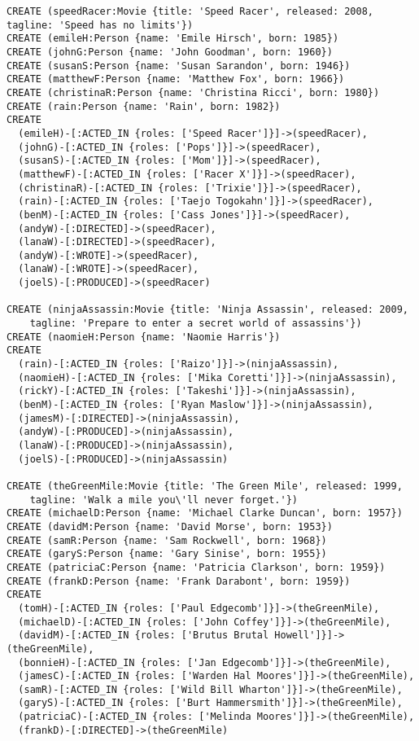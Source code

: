 \begin{lstlisting}
CREATE (speedRacer:Movie {title: 'Speed Racer', released: 2008, tagline: 'Speed has no limits'})
CREATE (emileH:Person {name: 'Emile Hirsch', born: 1985})
CREATE (johnG:Person {name: 'John Goodman', born: 1960})
CREATE (susanS:Person {name: 'Susan Sarandon', born: 1946})
CREATE (matthewF:Person {name: 'Matthew Fox', born: 1966})
CREATE (christinaR:Person {name: 'Christina Ricci', born: 1980})
CREATE (rain:Person {name: 'Rain', born: 1982})
CREATE
  (emileH)-[:ACTED_IN {roles: ['Speed Racer']}]->(speedRacer),
  (johnG)-[:ACTED_IN {roles: ['Pops']}]->(speedRacer),
  (susanS)-[:ACTED_IN {roles: ['Mom']}]->(speedRacer),
  (matthewF)-[:ACTED_IN {roles: ['Racer X']}]->(speedRacer),
  (christinaR)-[:ACTED_IN {roles: ['Trixie']}]->(speedRacer),
  (rain)-[:ACTED_IN {roles: ['Taejo Togokahn']}]->(speedRacer),
  (benM)-[:ACTED_IN {roles: ['Cass Jones']}]->(speedRacer),
  (andyW)-[:DIRECTED]->(speedRacer),
  (lanaW)-[:DIRECTED]->(speedRacer),
  (andyW)-[:WROTE]->(speedRacer),
  (lanaW)-[:WROTE]->(speedRacer),
  (joelS)-[:PRODUCED]->(speedRacer)

CREATE (ninjaAssassin:Movie {title: 'Ninja Assassin', released: 2009,
    tagline: 'Prepare to enter a secret world of assassins'})
CREATE (naomieH:Person {name: 'Naomie Harris'})
CREATE
  (rain)-[:ACTED_IN {roles: ['Raizo']}]->(ninjaAssassin),
  (naomieH)-[:ACTED_IN {roles: ['Mika Coretti']}]->(ninjaAssassin),
  (rickY)-[:ACTED_IN {roles: ['Takeshi']}]->(ninjaAssassin),
  (benM)-[:ACTED_IN {roles: ['Ryan Maslow']}]->(ninjaAssassin),
  (jamesM)-[:DIRECTED]->(ninjaAssassin),
  (andyW)-[:PRODUCED]->(ninjaAssassin),
  (lanaW)-[:PRODUCED]->(ninjaAssassin),
  (joelS)-[:PRODUCED]->(ninjaAssassin)

CREATE (theGreenMile:Movie {title: 'The Green Mile', released: 1999,
    tagline: 'Walk a mile you\'ll never forget.'})
CREATE (michaelD:Person {name: 'Michael Clarke Duncan', born: 1957})
CREATE (davidM:Person {name: 'David Morse', born: 1953})
CREATE (samR:Person {name: 'Sam Rockwell', born: 1968})
CREATE (garyS:Person {name: 'Gary Sinise', born: 1955})
CREATE (patriciaC:Person {name: 'Patricia Clarkson', born: 1959})
CREATE (frankD:Person {name: 'Frank Darabont', born: 1959})
CREATE
  (tomH)-[:ACTED_IN {roles: ['Paul Edgecomb']}]->(theGreenMile),
  (michaelD)-[:ACTED_IN {roles: ['John Coffey']}]->(theGreenMile),
  (davidM)-[:ACTED_IN {roles: ['Brutus Brutal Howell']}]->(theGreenMile),
  (bonnieH)-[:ACTED_IN {roles: ['Jan Edgecomb']}]->(theGreenMile),
  (jamesC)-[:ACTED_IN {roles: ['Warden Hal Moores']}]->(theGreenMile),
  (samR)-[:ACTED_IN {roles: ['Wild Bill Wharton']}]->(theGreenMile),
  (garyS)-[:ACTED_IN {roles: ['Burt Hammersmith']}]->(theGreenMile),
  (patriciaC)-[:ACTED_IN {roles: ['Melinda Moores']}]->(theGreenMile),
  (frankD)-[:DIRECTED]->(theGreenMile)


\end{lstlisting}
